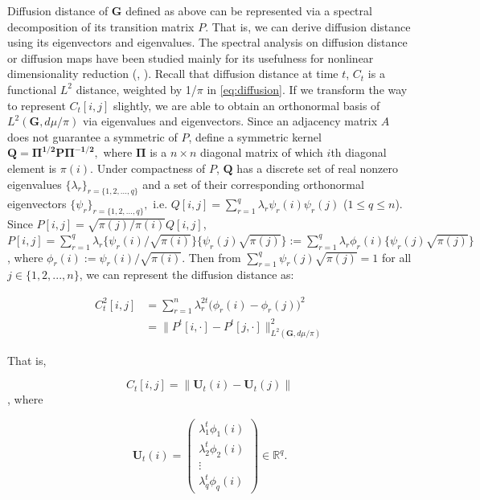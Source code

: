 \documentclass[12pt]{article}
\theoremstyle{definition}
\begin{document}
Diffusion distance of $\boldsymbol{G}$ defined as above can be represented via a spectral decomposition of its transition matrix $P$. That is, we can derive diffusion distance using its eigenvectors and eigenvalues. The spectral analysis on diffusion distance or diffusion maps have been studied mainly for its usefulness for nonlinear dimensionality reduction (\cite{coifman2006diffusion}, \cite{lafon2006diffusion}). 
Recall that diffusion distance at time $t$, $C_{t}$ is a functional $L^2$ distance, weighted by 1/$\pi$ in \ref{eq:diffusion}. If we transform the way to represent $C_{t}[i,j]$ slightly, we are able to obtain an orthonormal basis of $L^{2}(\mathbf{G}, d\mu / \pi)$ via eigenvalues and eigenvectors. 
Since an adjacency matrix $A$ does not guarantee a symmetric of $P$, define a symmetric kernel $\boldsymbol{Q} = \boldsymbol{\Pi^{1/2} P \Pi^{-1/2}},$ where $\mathbf{\Pi}$ is a $n \times n$ diagonal matrix of which $i$th diagonal element is $\pi(i)$. Under compactness of $P$, $\boldsymbol{Q}$ has a discrete set of real nonzero eigenvalues $\{ \lambda_{r} \}_{r = \{1,2,...,q \}}$ and a set of their corresponding orthonormal eigenvectors $\{ \psi_{r} \}_{r = \{1,2,..., q \} },$ i.e. $Q[i,j] = \sum\limits_{r=1}^{q} \lambda_{r} \psi_{r}(i) \psi_{r}(j)$ ($1 \leq q \leq n$).  
Since $P[i,j] = \sqrt{\pi(j) / \pi(i) } Q[i,j]$, $P[i,j]= \sum\limits_{r=1}^{q} \lambda_{r} \{ \psi_{r}(i) / \sqrt{\pi(i)}  \} \{ \psi_{r}(j) \sqrt{\pi(j)} \} := \sum\limits_{r=1}^{q} \lambda_{r} \phi_{r}(i) \{ \psi_{r}(j) \sqrt{\pi(j)} \}$, where $\phi_{r}(i) := \psi_{r}(i) / \sqrt{\pi(i)}$. Then from $\sum\limits_{r=1}^{q} \psi_{r}(j) \sqrt{\pi(j)} = 1$ for all $j \in \{1,2,...,n\}$, 
we can represent the diffusion distance as: 
	
\begin{equation}
\begin{split}
	C^2_{t}[i,j] & = \sum\limits_{r=1}^{n} \lambda^{2t}_{r} \big( \phi_{r} (i) - \phi_{r}(j)   \big)^2   \\ &  = \parallel P^{t}[i, \cdot] - P^{t}[j, \cdot]  \parallel^2_{L^{2}(\boldsymbol{G}, d\mu / \pi)  }
	\end{split}
\end{equation}
	
	That is,
	
	\begin{equation}
	C_{t}[i,j] = \parallel \boldsymbol{U}_{t}(i) - \boldsymbol{U}_{t}(j) \parallel
	\end{equation}
	, where 
	
	\begin{equation} 
	\boldsymbol{U}_{t}(i) = \begin{pmatrix} \lambda^{t}_{1} \phi_{1}(i) \\ \lambda^{t}_{2} \phi_{2} (i)  \\ \vdots \\ \lambda^{t}_{q} \phi_{q}(i) \end{pmatrix} \in \mathbb{R}^{q}.
	\end{equation}
	
\end{document}
